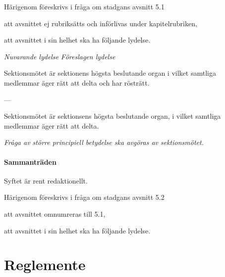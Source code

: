 \documentclass{article}
\newenvironment{lydelse}
    {\begin{paracol}{2}%
        \emph{Nuvarande lydelse}%
        \switchcolumn%
        \emph{Föreslagen lydelse}%
    \end{paracol}%
    \begin{enumerate}[label=\thesubsection.\arabic*]%
    \begin{paracol}{2}%
    }{\end{paracol}\end{enumerate}}
\begin{document}
Härigenom föreskrivs i fråga om stadgans avsnitt 5.1
\begin{dels}
    \item att avsnittet ej rubriksätts och införlivas under kapitelrubriken,
    \item att avsnittet i sin helhet ska ha följande lydelse.
\end{dels}

\begin{lydelse}
  \setcounter{subsection}{1}
    \item Sektionsmötet är sektionens högsta beslutande organ i vilket samtliga medlemmar äger rätt att delta och har rösträtt.

    \item[] ---
  \switchcolumn
  \setcounter{subsection}{0}
    \item Sektionsmötet är sektionsens högsta beslutande organ, i vilket samtliga medlemmar äger rätt att delta.

    \item \emph{Fråga av större principiell betydelse ska avgöras av sektionsmötet.}

\end{lydelse}

\setcounter{subsection}{0}
\subsection{Sammanträden}
Syftet är rent redaktionellt.

Härigenom föreskrivs i fråga om stadgans avsnitt 5.2
\begin{dels}
    \item att avsnittet omnumreras till 5.1,
    \item att avsnittet i sin helhet ska ha följande lydelse.
\end{dels}



\clearpage
\part{Reglemente}
\end{document}
